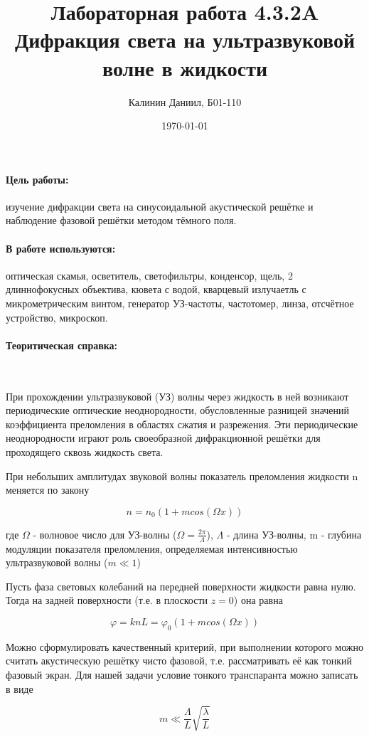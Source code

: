 \documentclass[a4paper, 12pt]{article}
\author{Калинин Даниил, Б01-110}
\date{\today}
\title{Лабораторная работа 4.3.2A Дифракция света на ультразвуковой волне в жидкости}
\newcommand{\parag}[1]{\paragraph*{#1:}}
\begin{document}
\maketitle
\parindent=0cm

\parag {Цель работы}
изучение дифракции света на синусоидальной 
акустической решётке и наблюдение фазовой решётки методом тёмного поля.

\parag {В работе используются}
оптическая скамья, осветитель,
светофильтры, конденсор, щель, 2 длиннофокусных объектива,
кювета с водой, кварцевый излучаетль с микрометрическим винтом,
генератор УЗ-частоты, частотомер, линза, отсчётное устройство,
микроскоп.

\parag {Теоритическая справка} ~\\
\par При прохождении ультразвуковой (УЗ) волны через жидкость в ней 
возникают периодические оптические неоднородности, обусловленные 
разницей значений коэффициента преломления в областях сжатия и 
разрежения. Эти периодические неоднородности играют роль своеобразной 
дифракционной решётки для проходящего сквозь жидкость света.\\
\par При небольших амплитудах звуковой волны показатель преломления 
жидкости n меняется по закону

\begin{equation*}
    n = n_0(1 + m cos(\Omega x))
\end{equation*}

где $\Omega$ - волновое число для УЗ-волны ($\Omega = \frac{2\pi}{\Lambda}$), 
$\Lambda$ - длина УЗ-волны, m - глубина модуляции показателя преломления, определяемая
интенсивностью ультразвуковой волны ($m \ll 1$)

\par Пусть фаза световых колебаний на передней поверхности жидкости равна
нулю. Тогда на задней поверхности (т.е. в плоскости $z = 0$) она равна

\begin{equation*}
    \varphi = knL = \varphi_0(1 + m cos(\Omega x))
\end{equation*}

\par Можно сформулировать качественный критерий, при выполнении которого
можно считать акустическую решётку чисто фазовой, т.е. рассматривать её 
как тонкий фазовый экран. Для нашей задачи условие тонкого транспаранта 
можно записать в виде

\begin{equation*}
    m \ll \frac{\Lambda}{L}\sqrt{\frac{\lambda}{L}}
\end{equation*}
\end{document}
